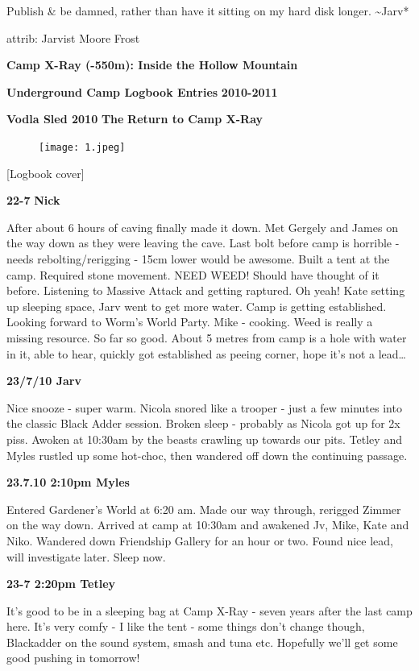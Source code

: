 Publish \& be damned, rather than have it sitting on my hard disk
longer. \textasciitilde{}Jarv*

attrib: Jarvist Moore Frost

\textbf{Camp X-Ray (-550m): Inside the Hollow Mountain}

\textbf{Underground Camp Logbook Entries} \textbf{2010-2011}

\textbf{Vodla Sled 2010} \textbf{The} \textbf{Return to Camp X-Ray}

\begin{figure}[htbp]
\centering
\texttt{[image: 1.jpeg]}
\caption{}
\end{figure}

{[}Logbook cover{]}

\textbf{22-7} \textbf{Nick}

After about 6 hours of caving finally made it down. Met Gergely and
James on the way down as they were leaving the cave. Last bolt before
camp is horrible - needs rebolting/rerigging - 15cm lower would be
awesome. Built a tent at the camp. Required stone movement. NEED WEED!
Should have thought of it before. Listening to Massive Attack and
getting raptured. Oh yeah! Kate setting up sleeping space, Jarv went to
get more water. Camp is getting established. Looking forward to Worm's
World Party. Mike - cooking. Weed is really a missing resource. So far
so good. About 5 metres from camp is a hole with water in it, able to
hear, quickly got established as peeing corner, hope it's not a
lead\ldots{}

\textbf{23/7/10 Jarv}

Nice snooze - super warm. Nicola snored like a trooper - just a few
minutes into the classic Black Adder session. Broken sleep - probably as
Nicola got up for 2x piss. Awoken at 10:30am by the beasts crawling up
towards our pits. Tetley and Myles rustled up some hot-choc, then
wandered off down the continuing passage.

\textbf{23.7.10 2:10pm Myles}

Entered Gardener's World at 6:20 am. Made our way through, rerigged
Zimmer on the way down. Arrived at camp at 10:30am and awakened Jv,
Mike, Kate and Niko. Wandered down Friendship Gallery for an hour or
two. Found nice lead, will investigate later. Sleep now.

\textbf{23-7 2:20pm Tetley}

It's good to be in a sleeping bag at Camp X-Ray - seven years after the
last camp here. It's very comfy - I like the tent - some things don't
change though, Blackadder on the sound system, smash and tuna etc.
Hopefully we'll get some good pushing in tomorrow!

